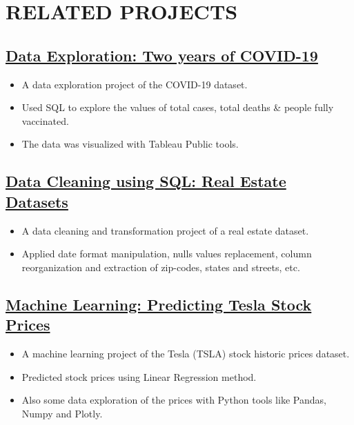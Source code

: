 \documentclass[10pt]{article} %
\begin{document}
\section*{RELATED PROJECTS}

\subsection*{\href{https://dquerales.github.io/DanielPortfolio/two_years_of_covid.html}{Data Exploration: Two years of COVID-19}}
 
\begin{itemize}
\itemsep0em
\item A data exploration project of the COVID-19 dataset.
\item Used SQL to explore the values of total cases, total deaths \& people fully vaccinated. 
\item The data was visualized with Tableau Public tools.
\end{itemize}

\subsection*{\href{https://github.com/dquerales/DataScience/tree/main/Projects}{Data Cleaning using SQL: Real Estate Datasets}}
 
\begin{itemize}
\itemsep0em
\item A data cleaning and transformation project of a real estate dataset.
\item Applied date format manipulation, nulls values replacement, column reorganization and extraction of zip-codes, states and streets, etc.
\end{itemize}

\subsection*{\href{https://dquerales.github.io/DanielPortfolio/linear_regression.html}{Machine Learning: Predicting Tesla Stock Prices}}

\begin{itemize}
\itemsep0em
\item A machine learning project of the Tesla (TSLA) stock historic prices dataset.
\item Predicted stock prices using Linear Regression method.
\item Also some data exploration of the prices with Python tools like Pandas, Numpy and Plotly. 
\end{itemize}
\end{document}
